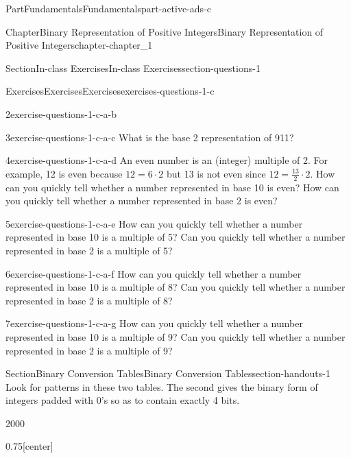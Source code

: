 \documentclass[oneside,10pt,]{book}
\numberwithin{equation}{section}
\begin{document}
\begin{partptx}{Part}{Fundamentals}{}{Fundamentals}{}{}{part-active-ads-c}
\begin{chapterptx}{Chapter}{Binary Representation of Positive Integers}{}{Binary Representation of Positive Integers}{}{}{chapter-chapter_1}
\begin{sectionptx}{Section}{In-class Exercises}{}{In-class Exercises}{}{}{section-questions-1}
\begin{exercises-subsection-numberless}{Exercises}{Exercises}{}{Exercises}{}{}{exercises-questions-1-c}
\begin{exercisegroup}
\begin{divisionexerciseeg}{2}{}{}{exercise-questions-1-c-a-b}
\end{divisionexerciseeg}%
\begin{divisionexerciseeg}{3}{}{}{exercise-questions-1-c-a-c}%
What is the base 2 representation of 911?%
\end{divisionexerciseeg}%
\begin{divisionexerciseeg}{4}{}{}{exercise-questions-1-c-a-d}%
An even number is an (integer) multiple of 2.  For example, 12 is even because \(12 = 6 \cdot 2\) but 13 is not even since \(12 = \frac{13}{2} \cdot 2\).  How can you quickly tell whether a number represented in base 10  is even?  How can you quickly tell whether a number represented in base 2  is even?%
\end{divisionexerciseeg}%
\begin{divisionexerciseeg}{5}{}{}{exercise-questions-1-c-a-e}%
How can you quickly tell whether a number represented in base 10  is a multiple of 5?  Can you quickly tell whether a number represented in base 2  is a multiple of 5?%
\end{divisionexerciseeg}%
\begin{divisionexerciseeg}{6}{}{}{exercise-questions-1-c-a-f}%
How can you quickly tell whether a number represented in base 10  is a multiple of 8? Can you quickly tell whether a number represented in base 2  is a multiple of 8?%
\end{divisionexerciseeg}%
\begin{divisionexerciseeg}{7}{}{}{exercise-questions-1-c-a-g}%
How can you quickly tell whether a number represented in base 10  is a multiple of 9?  Can you quickly tell whether a number represented in base 2  is a multiple of 9?%
\end{divisionexerciseeg}%
\end{exercisegroup}
\par\medskip\noindent
\end{exercises-subsection-numberless}
\end{sectionptx}
%
%
\typeout{************************************************}
\typeout{************************************************}
%
\begin{sectionptx}{Section}{Binary Conversion Tables}{}{Binary Conversion Tables}{}{}{section-handouts-1}
Look for patterns in these two tables. The second gives the binary form of integers padded with 0's so as to contain exactly 4 bits.%
\begin{sidebyside}{2}{0}{0}{0}%
\begin{sbspanel}{0.75}[center]%

\end{sbspanel}
\end{sidebyside}
\end{sectionptx}
\end{chapterptx}
\end{partptx}
\end{document}
